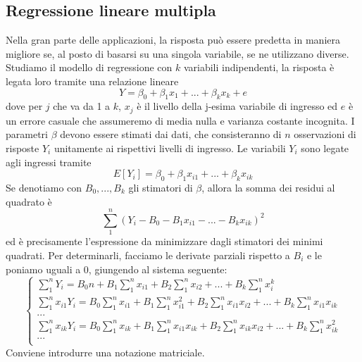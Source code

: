 \documentclass[11pt]{article}
\begin{document}
\subsection{Regressione lineare multipla}
Nella gran parte delle applicazioni, la risposta può essere predetta in maniera migliore se, al posto di basarsi su una singola variabile, se ne utilizzano diverse. Studiamo il modello di regressione con $k$ variabili indipendenti, la risposta è legata loro tramite una relazione lineare
\begin{displaymath}
    Y=\beta_0+\beta_1 x_1 + ... + \beta_k x_k + e
\end{displaymath}
dove per $j$ che va da 1 a $k$, $x_j$ è il livello della j-esima variabile di ingresso ed $e$ è un errore casuale che assumeremo di media nulla e varianza costante incognita. I parametri $\beta$ devono essere stimati dai dati, che consisteranno di $n$ osservazioni di risposte $Y_i$ unitamente ai rispettivi livelli di ingresso. Le variabili $Y_i$ sono legate agli ingressi tramite
\begin{displaymath}
    E[Y_i] = \beta_0 + \beta_1 x_{i1} + ... + \beta_k x_{ik}
\end{displaymath}
Se denotiamo con $B_0,...,B_k$ gli stimatori di $\beta$, allora la somma dei residui al quadrato è 
\begin{displaymath}
    \sum_1^n (Y_i-B_0- B_1x_{i1}-...-B_kx_{ik})^2
\end{displaymath}
ed è precisamente l'espressione da minimizzare dagli stimatori dei minimi quadrati. Per determinarli, facciamo le derivate parziali rispetto a $B_i$ e le poniamo uguali a 0, giungendo al sistema seguente:
\begin{displaymath}
    \begin{cases}
        \sum_1^n Y_i = B_0n+B_1\sum_1^n x_{i1} + B_2\sum_1^n x_{i2}+...+B_k\sum_1^n x_i^k\\ 
        \sum_1^n x_{i1}Y_i = B_0\sum_1^n x_{i1}+B_1\sum_1^n x_{i1}^2 + B_2\sum_1^n x_{i1}x_{i2}+...+B_k\sum_1^n x_{i1}x_{ik}\\ 
        ...\\
        \sum_1^n x_{ik}Y_i = B_0\sum_1^n x_{ik}+B_1\sum_1^n x_{i1}x_{ik} + B_2\sum_1^n x_{ik}x_{i2}+...+B_k\sum_1^n x_{ik}^2\\ 
    ...\\    \end{cases}
\end{displaymath}
Conviene introdurre una notazione matriciale.
\end{document}
